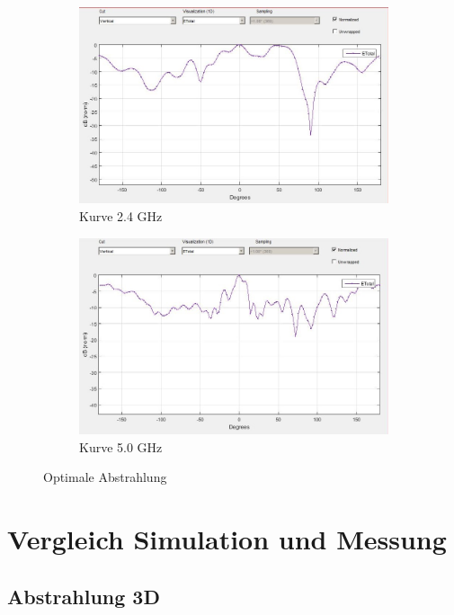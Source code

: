 \begin{figure}[h!]
	\begin{subfigure}[t]{0.49\textwidth}
		\includegraphics[width=1\textwidth]{../fig/plt/2_4GHz_E_tot_curve.jpg}
		\caption{Kurve 2.4 GHz}
	\end{subfigure}
	\begin{subfigure}[t]{0.49\textwidth}
		\includegraphics[width=1\textwidth]{../fig/plt/5GHz_E_tot_curve.jpg}
		\caption{Kurve 5.0 GHz}
	\end{subfigure}
	\caption{Optimale Abstrahlung}
\end{figure}



\clearpage
\section{Vergleich Simulation und Messung}

\subsection{Abstrahlung 3D}


